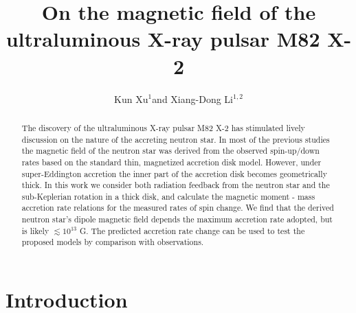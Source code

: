 \documentclass[12pt,preprint]{aastex}
\begin{document}
\begin{tiny}

\end{tiny}
\title{On the magnetic field of the ultraluminous X-ray pulsar M82 X-2}
\author{Kun Xu$^{1}$and Xiang-Dong Li$^{1,2}$
}



\begin{abstract}
The discovery of the ultraluminous X-ray pulsar M82 X-2 has stimulated lively discussion on the nature of the accreting neutron star. In most of the previous studies the magnetic field of the neutron star was derived from the observed spin-up/down rates based on the standard thin, magnetized accretion disk model. However, under super-Eddington accretion  the inner part of the accretion disk becomes geometrically thick. In this work we consider both radiation feedback from the neutron star and the sub-Keplerian rotation in a thick disk, and calculate the magnetic moment - mass accretion rate relations for the measured rates of spin change. We find that the derived neutron star's dipole magnetic field depends the maximum accretion rate adopted, but is likely $\lesssim 10^{13}$ G. The predicted accretion rate change can be used to test the proposed models by comparison with observations.

\end{abstract}


\section{Introduction}
\end{document}
